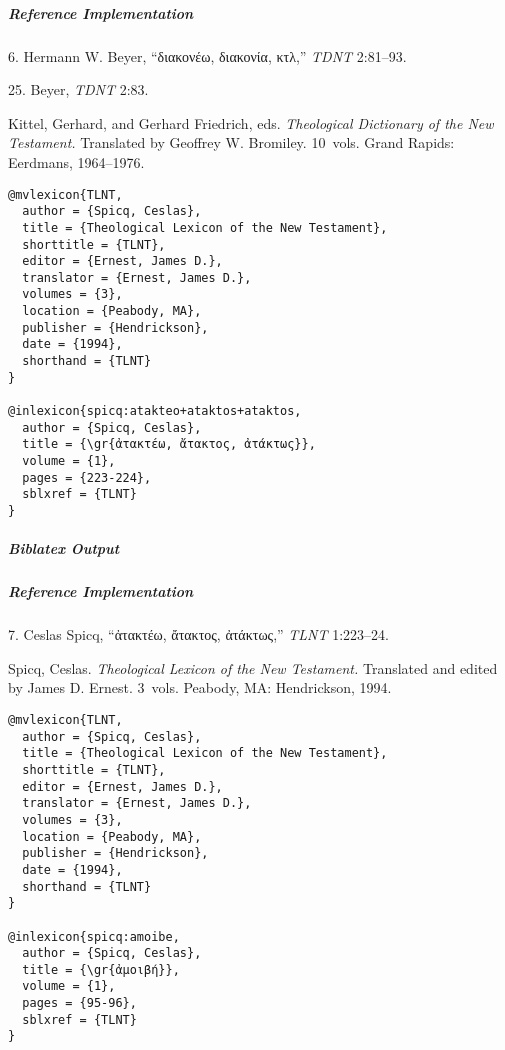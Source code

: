 \documentclass[a4paper]{article}
\newcommand{\gr}[1]{{\greekfont #1}}
\newenvironment{biboutput}{%
  \subparagraph{Biblatex Output}
}{\color{black}}
\newenvironment{refimp}{%
  \subparagraph{Reference Implementation}
  \color{reference-colour}
  \rm
}{\par\color{black}}
\begin{document}
\begin{refimp}
  6. Hermann W. Beyer, “\gr{διακονέω, διακονία, κτλ},” \emph{TDNT} 2:81–93.

  25. Beyer, \emph{TDNT} 2:83.

  \hangindent\bibindent Kittel, Gerhard, and Gerhard Friedrich, eds.
  \emph{Theological Dictionary of the New Testament.} Translated by Geoffrey
  W. Bromiley. 10~vols. Grand Rapids: Eerdmans, 1964–1976.

\end{refimp}

\medskip

\begin{lstlisting}
@mvlexicon{TLNT,
  author = {Spicq, Ceslas},
  title = {Theological Lexicon of the New Testament},
  shorttitle = {TLNT},
  editor = {Ernest, James D.},
  translator = {Ernest, James D.},
  volumes = {3},
  location = {Peabody, MA},
  publisher = {Hendrickson},
  date = {1994},
  shorthand = {TLNT}
}

@inlexicon{spicq:atakteo+ataktos+ataktos,
  author = {Spicq, Ceslas},
  title = {\gr{ἀτακτέω, ἄτακτος, ἀτάκτως}},
  volume = {1},
  pages = {223-224},
  sblxref = {TLNT}
}
\end{lstlisting}

\begin{biboutput}
\end{biboutput}

\begin{refimp}
  7. Ceslas Spicq, “\gr{ἀτακτέω, ἄτακτος, ἀτάκτως},” \emph{TLNT} 1:223–24.

  \hangindent\bibindent Spicq, Ceslas. \emph{Theological Lexicon of the New
  Testament.} Translated and edited by James D. Ernest. 3~vols. Peabody, MA:
  Hendrickson, 1994.

\end{refimp}

\medskip

\begin{lstlisting}
@mvlexicon{TLNT,
  author = {Spicq, Ceslas},
  title = {Theological Lexicon of the New Testament},
  shorttitle = {TLNT},
  editor = {Ernest, James D.},
  translator = {Ernest, James D.},
  volumes = {3},
  location = {Peabody, MA},
  publisher = {Hendrickson},
  date = {1994},
  shorthand = {TLNT}
}

@inlexicon{spicq:amoibe,
  author = {Spicq, Ceslas},
  title = {\gr{ἀμοιβή}},
  volume = {1},
  pages = {95-96},
  sblxref = {TLNT}
}
\end{lstlisting}
\end{document}

